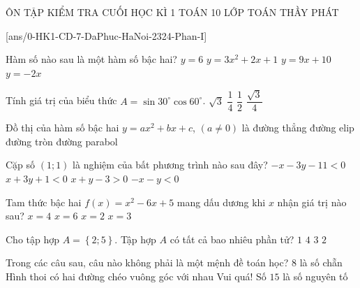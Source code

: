 ﻿\begin{name}
	{ÔN TẬP KIỂM TRA CUỐI HỌC KÌ 1}
	{TOÁN 10}
	{LỚP TOÁN THẦY PHÁT}
	{\thoigian}
\end{name}
\caulc
{}[ans/0-HK1-CD-7-DaPhuc-HaNoi-2324-Phan-I]
\begin{ex}%
	Hàm số nào sau là một hàm số bậc hai?
	\choice
	{$y=6$}
	{\True $y=3x^2+2x+1$}
	{$y=9x+10$}
	{$y=-2x$}
\end{ex}
\begin{ex}%
Tính giá trị của biểu thức $A=\sin 30^\circ\cos 60^\circ$.
\choice
{$\sqrt{3}$}
{\True $\dfrac{1}{4}$}
{$\dfrac{1}{2}$}
{$\dfrac{\sqrt{3}}{4}$}
\end{ex}
\begin{ex}%
	Đồ thị của hàm số bậc hai $y=ax^2+bx+c$, $\left(a\ne 0\right)$ là
	\choice
	{đường thẳng}
	{đường elip}
	{đường tròn}
	{\True đường parabol}
\end{ex}
\begin{ex}%
	Cặp số $(1;1)$ là nghiệm của bất phương trình nào sau đây?
	\choice
	{$-x-3y-11<0$}
	{$x+3y+1<0$}
	{$x+y-3>0$}
	{\True $-x-y<0$}
\end{ex}
\begin{ex}%
	Tam thức bậc hai $f(x)=x^2-6x+5$ mang dấu dương khi $x$ nhận giá trị nào sau?
	\choice
	{$x=4$}
	{\True $x=6$}
	{$x=2$}
	{$x=3$}
\end{ex}
\begin{ex}%
	Cho tập hợp $A=\left\{ 2;5\right\}$. Tập hợp $A$ có tất cả bao nhiêu phần tử?
	\choice
	{$1$}
	{$4$}
	{$3$}
	{\True $2$}
\end{ex}
\begin{ex}%
	Trong các câu sau, câu nào không phải là một mệnh đề toán học?
	\choice
	{$8$ là số chẵn}
	{Hình thoi có hai đường chéo vuông góc với nhau}
	{\True Vui quá!}
	{Số $15$ là số nguyên tố}
\end{ex}


